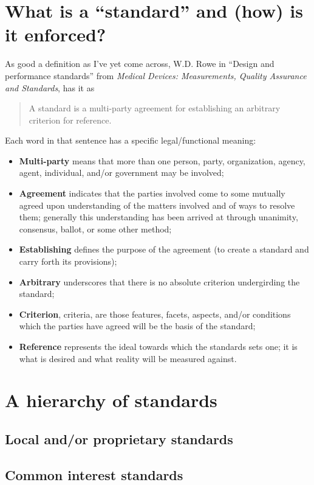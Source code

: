 \documentclass[11pt]{book}
\begin{document}
\section{What is a ``standard'' and (how) is it enforced?}
As good a definition as I've yet come across, W.D. Rowe in ``Design and performance standards'' from \textit{Medical Devices: Measurements, Quality Assurance and Standards}, has it as

\begin{quote}
	A standard is a multi-party agreement for establishing an arbitrary criterion for reference.
\end{quote}
Each word in that sentence has a specific legal/functional meaning:
\begin{itemize}
	\item \textbf{Multi-party} means that more than one person, party, organization, agency, agent, individual, and/or government may be involved;
	\item \textbf{Agreement} indicates that the parties involved come to some mutually agreed upon understanding of the matters involved and of ways to resolve them; generally this understanding has been arrived at through unanimity, consensus, ballot, or some other method;
	\item \textbf{Establishing} defines the purpose of the agreement (to create a standard and carry forth its provisions);
	\item \textbf{Arbitrary} underscores that there is no absolute criterion undergirding the standard;
	\item \textbf{Criterion}, criteria, are those features, facets, aspects, and/or conditions which the parties have agreed will be the basis of the standard;
	\item \textbf{Reference} represents the ideal towards which the standards sets one; it is what is desired and what reality will be measured against.
\end{itemize}


\section{A hierarchy of standards}
\subsection{Local and/or proprietary standards}
\subsection{Common interest standards}
\end{document}
